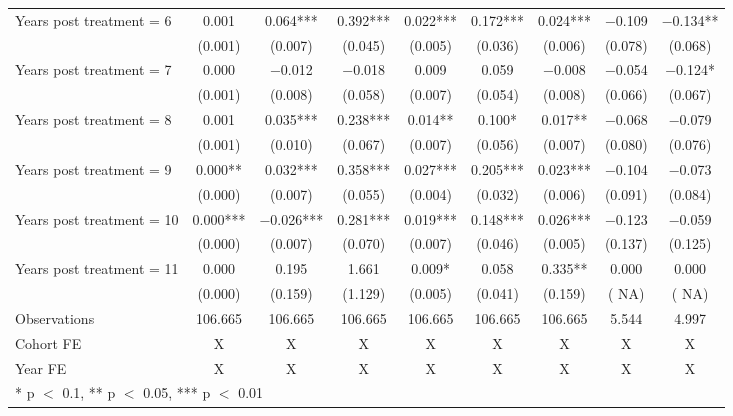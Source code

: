 \begin{table}[H]
{\begin{threeparttable}
\begin{tabular}[t]{lcccccccc}
Years post treatment = 6 & \num{0.001} & \num{ 0.064}*** & \num{ 0.392}*** & \num{0.022}*** & \num{0.172}*** & \num{ 0.024}*** & \num{-0.109} & \num{-0.134}**\\
 & (\num{0.001}) & (\num{0.007}) & (\num{0.045}) & (\num{0.005}) & (\num{0.036}) & (\num{0.006}) & (\num{0.078}) & (\num{0.068})\\
Years post treatment = 7 & \num{0.000} & \num{-0.012} & \num{-0.018} & \num{0.009} & \num{0.059} & \num{-0.008} & \num{-0.054} & \num{-0.124}*\\
 & (\num{0.001}) & (\num{0.008}) & (\num{0.058}) & (\num{0.007}) & (\num{0.054}) & (\num{0.008}) & (\num{0.066}) & (\num{0.067})\\
Years post treatment = 8 & \num{0.001} & \num{ 0.035}*** & \num{ 0.238}*** & \num{0.014}** & \num{0.100}* & \num{ 0.017}** & \num{-0.068} & \num{-0.079}\\
 & (\num{0.001}) & (\num{0.010}) & (\num{0.067}) & (\num{0.007}) & (\num{0.056}) & (\num{0.007}) & (\num{0.080}) & (\num{0.076})\\
Years post treatment = 9 & \num{0.000}** & \num{ 0.032}*** & \num{ 0.358}*** & \num{0.027}*** & \num{0.205}*** & \num{ 0.023}*** & \num{-0.104} & \num{-0.073}\\
 & (\num{0.000}) & (\num{0.007}) & (\num{0.055}) & (\num{0.004}) & (\num{0.032}) & (\num{0.006}) & (\num{0.091}) & (\num{0.084})\\
Years post treatment = 10 & \num{0.000}*** & \num{-0.026}*** & \num{ 0.281}*** & \num{0.019}*** & \num{0.148}*** & \num{ 0.026}*** & \num{-0.123} & \num{-0.059}\\
 & (\num{0.000}) & (\num{0.007}) & (\num{0.070}) & (\num{0.007}) & (\num{0.046}) & (\num{0.005}) & (\num{0.137}) & (\num{0.125})\\
Years post treatment = 11 & \num{0.000} & \num{ 0.195} & \num{ 1.661} & \num{0.009}* & \num{0.058} & \num{ 0.335}** & \num{ 0.000} & \num{ 0.000}\\
 & (\num{0.000}) & (\num{0.159}) & (\num{1.129}) & (\num{0.005}) & (\num{0.041}) & (\num{0.159}) & (\num{   NA}) & (\num{   NA})\\
\midrule
Observations & \num{106,665} & \num{106,665} & \num{106,665} & \num{106,665} & \num{106,665} & \num{106,665} & \num{5,544} & \num{4,997}\\
Cohort FE & X & X & X & X & X & X & X & X\\
Year FE & X & X & X & X & X & X & X & X\\
\bottomrule
\multicolumn{9}{l}{\rule{0pt}{1em}* p $<$ 0.1, ** p $<$ 0.05, *** p $<$ 0.01}\\

\end{tabular}
\end{threeparttable}}
\end{table}
